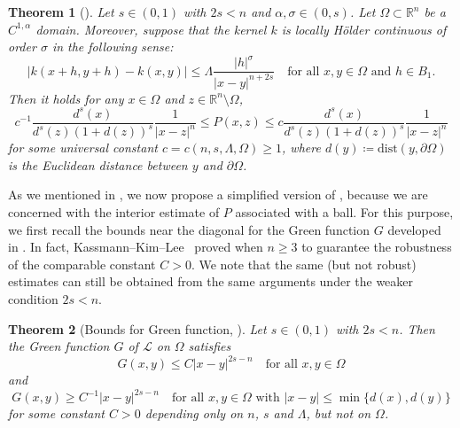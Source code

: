 \documentclass[11pt]{amsart}
\theoremstyle{plain}
\newtheorem{theorem}{Theorem}[section]
\theoremstyle{definition}
\numberwithin{equation}{section}
\begin{document}
    \begin{theorem}[{\cite[Corollary~9.6]{KW24b}}]\label{cor-Green}
    Let $s \in (0,1)$ with $2s<n$ and $\alpha, \sigma \in (0,s)$. Let $\Omega \subset \mathbb{R}^n$ be a $C^{1, \alpha}$ domain. Moreover, suppose that the kernel $k$ is locally H\"older continuous of order $\sigma$ in the following sense: 
    \begin{equation}\label{eq-kernel-holder}
        |k(x+h, y+h)-k(x, y)| \leq \Lambda \frac{|h|^{\sigma}}{|x-y|^{n+2s}}\quad \text{for all $x, y \in \Omega$ and $h \in B_1$.}
    \end{equation}
    Then it holds for any $x \in \Omega$ and $z \in \mathbb{R}^n \setminus \Omega$,
         \begin{equation*}
        c^{-1} \frac{d^s(x)}{d^s(z)(1+d(z))^s} \frac{1}{|x-z|^{n}}\leq P(x, z) \leq c \frac{d^s(x)}{d^s(z)(1+d(z))^s}\frac{1}{|x-z|^{n}}
     \end{equation*}
     for some universal constant $c=c(n,s, \Lambda, \Omega) \geq 1$, where $d(y) \coloneqq \mathrm{dist}(y, \partial \Omega)$ is the Euclidean distance between $y$ and $\partial \Omega$. 
    \end{theorem}

   As we mentioned in , we now propose a simplified version of , because we are concerned with the interior estimate of $P$ associated with a ball. For this purpose, we first recall the bounds near the diagonal for the Green function $G$ developed in \cite{KKL23}. In fact, Kassmann--Kim--Lee~\cite{KKL23} proved  when $n \geq 3$ to guarantee the robustness of the comparable constant $C>0$. We note that the same (but not robust) estimates can still be obtained from the same arguments under the weaker condition $2s<n$.
    
     \begin{theorem}[Bounds for Green function, {\cite[Theorems~1.4 and 1.5]{KKL23}}]\label{thm-Greenest}
         Let $s \in (0, 1)$ with $2s<n$. Then the Green function $G$ of $\mathcal{L}$ on $\Omega$ satisfies
         \begin{equation*}
             G(x, y) \leq C|x-y|^{2s-n} \quad \text{for all $x, y \in \Omega$}
         \end{equation*}
         and
          \begin{equation*}
             G(x, y) \geq C^{-1}|x-y|^{2s-n} \quad \text{for all $x, y \in \Omega$ with $|x-y| \leq \min\{d(x), d(y)\}$}
         \end{equation*}
         for some constant $C>0$ depending only on $n$, $s$ and $\Lambda$, but not on $\Omega$.
     \end{theorem}
\end{document}

